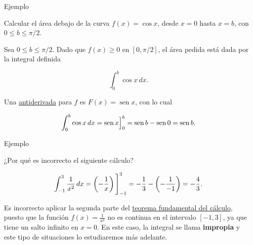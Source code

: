 \documentclass[
  letterpaper,
]{book}
\theoremstyle{plain}
\theoremstyle{remark}
\begin{document}
Ejemplo

Calcular el área debajo de la curva \(f(x)=\cos x\), desde \(x=0\) hasta
\(x=b\), con \(0\leq b\leq \pi/2\).

\begin{tcolorbox}[enhanced jigsaw, opacityback=0, left=2mm, opacitybacktitle=0.6, toprule=.15mm, bottomrule=.15mm, colbacktitle=quarto-callout-tip-color!10!white, titlerule=0mm, bottomtitle=1mm, title=\textcolor{quarto-callout-tip-color}{\faLightbulb}\hspace{0.5em}{Solución}, toptitle=1mm, colframe=quarto-callout-tip-color-frame, colback=white, breakable, rightrule=.15mm, arc=.35mm, leftrule=.75mm, coltitle=black]

Sea \(0\leq b\leq \pi/2\). Dado que \(f(x)\geq 0\) en \([0,\pi/2]\), el
área pedida está dada por la integral definida

\[
\int_0^b \cos x\,dx.
\]

Una \hyperref[tabla-antiderivadas]{antiderivada} para \(f\) es
\(F(x)=\operatorname{sen} x\), con lo cual

\[
\int_0^b \cos x\,dx=\operatorname{sen} x\Big{]}_{0}^b=\operatorname{sen} b-\operatorname{sen} 0=\operatorname{sen} b.
\]

\end{tcolorbox}

Ejemplo

¿Por qué es incorrecto el siguiente cálculo?

\[
\int_{-1}^3 \frac{1}{x^2}\,dx = \left(-\frac{1}{x}\right)\Bigg{]}_{-1}^{3}=-\frac{1}{3}-\left(-\frac{1}{-1}\right)=-\frac{4}{3}.
\]

\begin{tcolorbox}[enhanced jigsaw, opacityback=0, left=2mm, opacitybacktitle=0.6, toprule=.15mm, bottomrule=.15mm, colbacktitle=quarto-callout-tip-color!10!white, titlerule=0mm, bottomtitle=1mm, title=\textcolor{quarto-callout-tip-color}{\faLightbulb}\hspace{0.5em}{Solución}, toptitle=1mm, colframe=quarto-callout-tip-color-frame, colback=white, breakable, rightrule=.15mm, arc=.35mm, leftrule=.75mm, coltitle=black]

Es incorrecto aplicar la segunda parte del \hyperref[teo-TFC2]{teorema
fundamental del cálculo}, puesto que la función \(f(x)=\frac{1}{x^2}\)
no es continua en el intervalo \([-1,3]\), ya que tiene un salto
infinito en \(x=0\). En este caso, la integral se llama
\textbf{impropia} y este tipo de situaciones lo estudiaremos más
adelante.

\end{tcolorbox}
\end{document}
